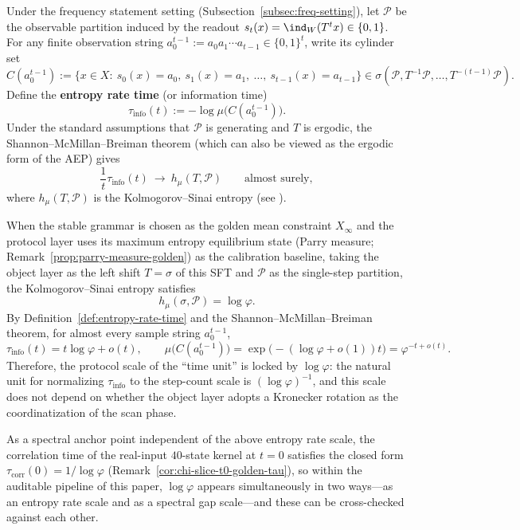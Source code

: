 \begin{definition}\label{def:entropy-rate-time}
Under the frequency statement setting (Subsection~\ref{subsec:freq-setting}), let \(\mathcal{P}\) be the observable partition induced by the readout \(s_t(x)=\ind_W(T^t x)\in\{0,1\}\).
For any finite observation string \(a_0^{t-1}:=a_0a_1\cdots a_{t-1}\in\{0,1\}^t\), write its cylinder set
\[
C(a_0^{t-1})
:=\bigl\{x\in X:\ s_0(x)=a_0,\ s_1(x)=a_1,\ \dots,\ s_{t-1}(x)=a_{t-1}\bigr\}\in\sigma(\mathcal{P},T^{-1}\mathcal{P},\dots,T^{-(t-1)}\mathcal{P}).
\]
Define the \textbf{entropy rate time} (or information time)
\[
\tau_{\mathrm{info}}(t)
:=-\log \mu\bigl(C(a_0^{t-1})\bigr).
\]
Under the standard assumptions that \(\mathcal{P}\) is generating and \(T\) is ergodic, the Shannon--McMillan--Breiman theorem (which can also be viewed as the ergodic form of the AEP) gives
\[
\frac{1}{t}\tau_{\mathrm{info}}(t)\ \longrightarrow\ h_\mu(T,\mathcal{P})
\qquad\text{almost surely},
\]
where \(h_\mu(T,\mathcal{P})\) is the Kolmogorov--Sinai entropy (see \cite{WaltersErgodicTheory,CoverThomas2006}).
\end{definition}

\begin{proposition}\label{prop:time-unit-logphi-protocol}
When the stable grammar is chosen as the golden mean constraint \(X_\infty\) and the protocol layer uses its maximum entropy equilibrium state (Parry measure; Remark~\ref{prop:parry-measure-golden}) as the calibration baseline,
taking the object layer as the left shift \(T=\sigma\) of this SFT and \(\mathcal{P}\) as the single-step partition, the Kolmogorov--Sinai entropy satisfies
\[
h_\mu(\sigma,\mathcal{P})=\log\varphi.
\]
By Definition~\ref{def:entropy-rate-time} and the Shannon--McMillan--Breiman theorem, for almost every sample string \(a_0^{t-1}\),
\[
\tau_{\mathrm{info}}(t)=t\log\varphi+o(t),
\qquad
\mu\bigl(C(a_0^{t-1})\bigr)=\exp\!\bigl(-(\log\varphi+o(1))t\bigr)=\varphi^{-t+o(t)}.
\]
Therefore, the protocol scale of the ``time unit'' is locked by \(\log\varphi\): the natural unit for normalizing \(\tau_{\mathrm{info}}\) to the step-count scale is \((\log\varphi)^{-1}\), and this scale does not depend on whether the object layer adopts a Kronecker rotation as the coordinatization of the scan phase.\par
As a spectral anchor point independent of the above entropy rate scale, the correlation time of the real-input \(40\)-state kernel at \(t=0\) satisfies the closed form
\(\tau_{\mathrm{corr}}(0)=1/\log\varphi\) (Remark~\ref{cor:chi-slice-t0-golden-tau}), so within the auditable pipeline of this paper, \(\log\varphi\) appears simultaneously in two ways---as an entropy rate scale and as a spectral gap scale---and these can be cross-checked against each other.
\end{proposition}

